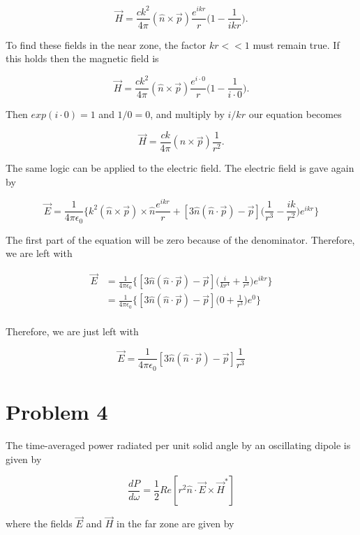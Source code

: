 \documentclass[11pt]{article}
\begin{document}
$$
    \vec{H} = \frac{ck^{2}}{4\pi} (\hat{n} \times \vec{p}) \frac{e^{ikr}}{r} \Bigg(1 - \frac{1}{ikr}\Bigg).
$$

To find these fields in the near zone, the factor $kr << 1$ must remain true. If this holds then the magnetic field is

$$
    \vec{H} = \frac{ck^{2}}{4\pi} (\hat{n} \times \vec{p}) \frac{e^{i  \cdot 0}}{r} \Bigg(1 - \frac{1}{i \cdot 0}\Bigg).
$$

Then $exp(i \cdot 0) = 1$ and $1/0 = 0$, and multiply by $i/kr$ our equation becomes 

$$
    \vec{H} = \frac{ck}{4\pi} (\hat{n} \times \vec{p}) \frac{1}{r^{2}}.
$$

The same logic can be applied to the electric field. The electric field is gave again by

$$
\vec{E} = \frac{1}{4\pi \epsilon_{0}} \Bigg\{ k^{2} (\hat{n} \times \vec{p}) \times \hat{n} \frac{e^{ikr}}{r} + [3\hat{n}(\hat{n} \cdot \vec{p}) - \vec{p}] \Bigg(\frac{1}{r^{3}} - \frac{ik}{r^{2}}\Bigg )e^{ikr} \Bigg\}
$$

The first part of the equation will be zero because of the denominator. Therefore, we are left with 

\begin{align*}
\vec{E} &= \frac{1}{4\pi \epsilon_{0}} \Bigg\{[3\hat{n}(\hat{n} \cdot \vec{p}) - \vec{p}] \Bigg(\frac{i}{kr^{4}} + \frac{1}{r^{3}}\Bigg )e^{ikr} \Bigg\} \\
&= \frac{1}{4\pi \epsilon_{0}} \Bigg\{[3\hat{n}(\hat{n} \cdot \vec{p}) - \vec{p}] \Bigg(0 + \frac{1}{r^{3}}\Bigg )e^{0} \Bigg\} \\
\end{align*}

\newpage

Therefore, we are just left with

$$
\vec{E} = \frac{1}{4\pi \epsilon_{0}} [3\hat{n}(\hat{n} \cdot \vec{p}) - \vec{p}] \frac{1}{r^{3}}
$$

\clearpage

\section*{Problem 4}

The time-averaged power radiated per unit solid angle by an oscillating dipole is given by

$$
\frac{dP}{d \omega} = \frac{1}{2} Re[r^{2}\hat{n} \cdot \vec{E} \times \vec{H}^{*}]
$$

where the fields $\vec{E}$ and $\vec{H}$ in the far zone are given by
\end{document}
